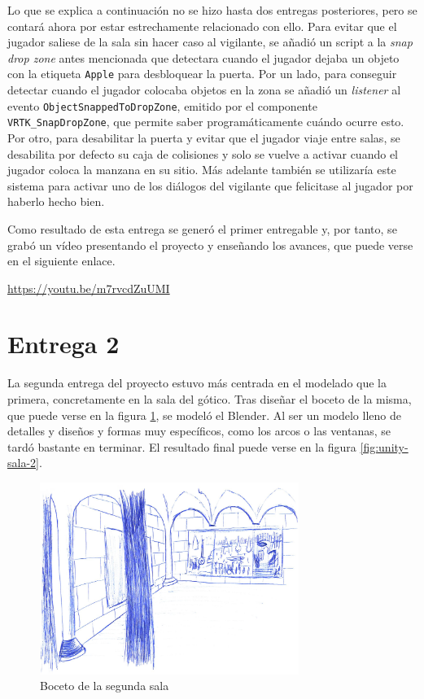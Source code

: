 Lo que se explica a continuación no se hizo hasta dos entregas posteriores, pero se contará ahora por estar estrechamente relacionado con ello. Para evitar que el jugador saliese de la sala sin hacer caso al vigilante, se añadió un script a la \textit{snap drop zone} antes mencionada que detectara cuando el jugador dejaba un objeto con la etiqueta \texttt{Apple} para desbloquear la puerta. Por un lado, para conseguir detectar cuando el jugador colocaba objetos en la zona se añadió un \textit{listener} al evento \texttt{ObjectSnappedToDropZone}, emitido por el componente \texttt{VRTK\_SnapDropZone}, que permite saber programáticamente cuándo ocurre esto. Por otro, para desabilitar la puerta y evitar que el jugador viaje entre salas, se desabilita por defecto su caja de colisiones y solo se vuelve a activar cuando el jugador coloca la manzana en su sitio. Más adelante también se utilizaría este sistema para activar uno de los diálogos del vigilante que felicitase al jugador por haberlo hecho bien.

Como resultado de esta entrega se generó el primer entregable y, por tanto, se grabó un vídeo presentando el proyecto y enseñando los avances, que puede verse en el siguiente enlace.

\begin{center}
    \url{https://youtu.be/m7rvcdZuUMI}
\end{center}



\section{Entrega 2}

La segunda entrega del proyecto estuvo más centrada en el modelado que la primera, concretamente en la sala del gótico. Tras diseñar el boceto de la misma, que puede verse en la figura \ref{fig:bocetos-sala-2}, se modeló el Blender. Al ser un modelo lleno de detalles y diseños y formas muy específicos, como los arcos o las ventanas, se tardó bastante en terminar. El resultado final puede verse en la figura \ref{fig:unity-sala-2}.

\begin{figure}[!h]
\begin{center}
\includegraphics[width=0.75\textwidth]{imagenes/7/bocetos/boceto-sala-2.png}
\caption{Boceto de la segunda sala}
\label{fig:bocetos-sala-2}
\end{center}
\end{figure}

